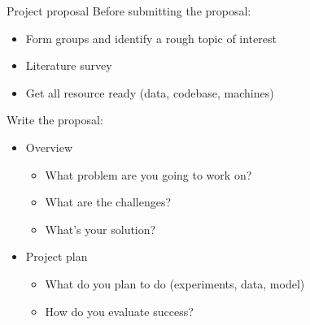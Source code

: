\documentclass[usenames,dvipsnames,notes,11pt,aspectratio=169,hyperref={colorlinks=true, linkcolor=blue}]{beamer}
\begin{document}
\begin{frame}
    {Project proposal}
    Before submitting the proposal:\\
    \begin{itemize}
        \item Form groups and identify a rough topic of interest
        \item Literature survey
        \item Get all resource ready (data, codebase, machines)
    \end{itemize}

    \pause
    Write the proposal:\\
    \begin{itemize}
        \item Overview
            \begin{itemize}
        \item What problem are you going to work on?
        \item What are the challenges?
        \item What's your solution?
            \end{itemize}
        \item Project plan
            \begin{itemize}
                \item What do you plan to do (experiments, data, model)
                \item How do you evaluate success?
            \end{itemize}
    \end{itemize}
\end{frame}
\end{document}
